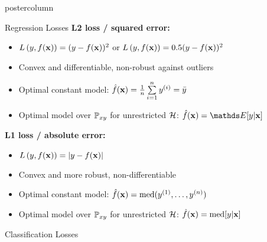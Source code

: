 \documentclass{beamer}
\begin{document}
\begin{frame}[fragile]{}
\begin{columns}
\begin{column}{.31\textwidth}
\begin{beamercolorbox}[center]{postercolumn}
\begin{minipage}{.98\textwidth}
{%
\begin{myblock}{Regression Losses}
  \textbf{L2 loss / squared error:} 
\begin{itemize}    
  \setlength{\itemindent}{+.3in}
  \item $L\left(y, f(\mathbf{x})\right) = (y-f(\mathbf{x}))^2$ or $L\left(y, f(\mathbf{x})\right) = 0.5 (y-f(\mathbf{x}))^2$
  \item Convex and differentiable, non-robust against outliers
  \item Optimal constant model: $\hat{f}(\mathbf{x}) = \frac{1}{n} \sum\limits_{i=1}^n y^{(i)} =
  \bar{y}$
  \item Optimal model over $\mathbb{P}_{xy}$ for unrestricted $\mathcal{H}$: $\fxh = \E[y | \xv]$
\end{itemize}

\vspace*{1ex}


  \textbf{L1 loss / absolute error:} 
\begin{itemize}
\setlength{\itemindent}{+.3in}
  \item $L\left(y, f(\mathbf{x})\right) = |y-f(\mathbf{x})|$
  \item Convex and more robust, non-differentiable
  \item Optimal constant model: $\hat{f}(\mathbf{x}) = \text{med}(y^{(1)}, \ldots, y^{(n)})$
  \item Optimal model over $\mathbb{P}_{xy}$ for unrestricted $\mathcal{H}$: $\hat{f}(\mathbf{x}) = \text{med} [y | \mathbf{x}]$
\end{itemize}
\end{myblock}


\begin{myblock}{Classification Losses}


\end{myblock}}
\end{minipage}
\end{beamercolorbox}
\end{column}
\end{columns}
\end{frame}
\end{document}
